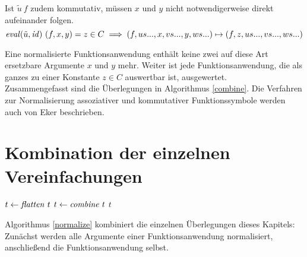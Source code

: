 Ist $\tilde u~f$ zudem kommutativ, müssen $x$ und $y$ nicht notwendigerweise direkt aufeinander folgen.
$$\mathit{eval}(\tilde u, \mathit{id})~(f, x, y) = z \in C \implies (f, us..., x, vs..., y, ws...) \mapsto (f, z, us..., vs..., ws...)$$

Eine normalisierte Funktionsanwendung enthält keine zwei auf diese Art ersetzbare Argumente $x$ und $y$ mehr. Weiter ist jede Funktionsanwendung, die als ganzes zu einer Konstante $z \in C$ auswertbar ist, ausgewertet.\\
Zusammengefasst sind die Überlegungen in Algorithmus \ref{combine}. Die Verfahren zur Normalisierung assoziativer und kommutativer Funktionssymbole werden auch von Eker \cite{BipartiteGraphMatching} beschrieben.

\section{Kombination der einzelnen Vereinfachungen} \label{subsecKomboNormal}

\begin{algorithm}
\DontPrintSemicolon
\caption{$\Const{normalize} \colon T \rightarrow T$}\label{normalize}

$t \leftarrow \mathit{flatten}~t$\;
$t \leftarrow \mathit{combine}~t$\;
\Return $t$ 
\end{algorithm}
Algorithmus \ref{normalize} kombiniert die einzelnen Überlegungen dieses Kapitels: Zunächst werden alle Argumente einer Funktionsanwendung normalisiert, anschließend die Funktionsanwendung selbst.





